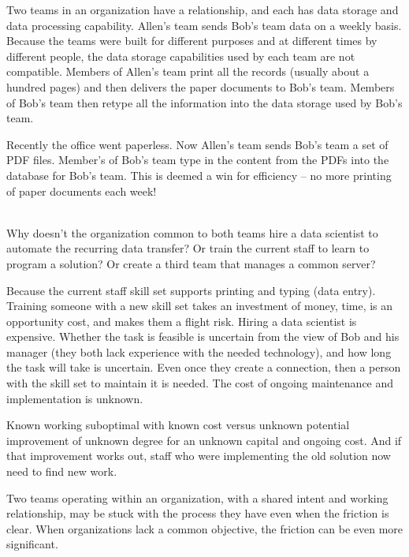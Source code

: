 \begin{mdframed}
Two teams in an organization have a relationship, and each has data storage and data processing capability. Allen's team sends Bob's team data on a weekly basis. Because the teams were built for different purposes and at different times by different people, the data storage capabilities used by each team are not compatible. Members of Allen's team print all the records (usually about a hundred pages) and then delivers the paper documents to Bob's team. Members of Bob's team then retype all the information into the data storage used by Bob's team.

Recently the office went paperless. Now Allen's team sends Bob's team a set of PDF files. Member's of Bob's team type in the content from the PDFs into the database for Bob's team. This is deemed a win for efficiency -- no more printing of paper documents each week!

\ \\

Why doesn't the organization common to both teams hire a data scientist to automate the recurring data transfer? Or train the current staff to learn to program a solution? Or create a third team that manages a common server?

Because the current staff skill set supports printing and typing (data entry). Training someone with a new skill set takes an investment of money, time, is an opportunity cost, and makes them a flight risk.
Hiring a data scientist is expensive. Whether the task is feasible is uncertain from the view of Bob and his manager (they both lack experience with the needed technology), and how long the task will take is uncertain. Even once they create a connection, then a person with the skill set to maintain it is needed. The cost of ongoing maintenance and implementation is unknown.

Known working suboptimal with known cost versus unknown potential improvement of unknown degree for an unknown capital and ongoing cost. And if that improvement works out, staff who were implementing the old solution now need to find new work.
\end{mdframed}

Two teams operating within an organization, with a shared intent and working relationship, may be stuck with the process they have even when the friction is clear. When organizations lack a common objective, the friction can be even more significant. 

